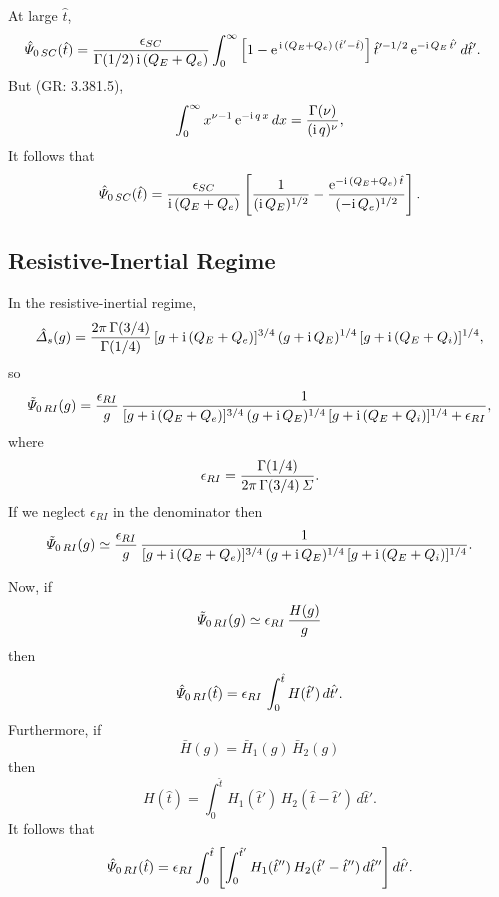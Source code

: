 \documentclass[titlepage=false,12pt]{article}
\begin{document}
At large $\hat{t}$, 
\begin{align}
\hat{\mit\Psi}_{0\,SC}(\hat{t}) &= \frac{\epsilon_{SC}}{\Gamma(1/2)\,{\rm i}\,(Q_E+Q_e)} \int
_0^{\infty}\left[1-{\rm e}^{\,{\rm i}\,(Q_E+Q_e)\,(\hat{t}'-\hat{t})}\right]
\hat{t}'^{-1/2}\,{\rm e}^{-{\rm i}\,Q_E\,\hat{t'}}\,d\hat{t}'.
\end{align}
But (GR: 3.381.5), 
\begin{equation}
\int_0^\infty x^{\nu-1}\,{\rm e}^{-{\rm i}\,q\,x}\,dx = \frac{\Gamma(\nu)}{({\rm i}\,q)^{\nu}},
\end{equation}
It follows that
\begin{equation}
\hat{\mit\Psi}_{0\,SC}(\hat{t}) = \frac{\epsilon_{SC}}{{\rm i}\,(Q_E+Q_e)}
\left[\frac{1}{({\rm i}\,Q_E)^{1/2}} - \frac{{\rm e}^{-{\rm i}\,(Q_E+Q_e)\,\hat{t}}}{(-{\rm i}\,Q_e)^{1/2}}\right].
\end{equation}

\subsection{Resistive-Inertial Regime}
In the resistive-inertial regime, 
\begin{equation}
\hat{\mit\Delta}_s(g) = \frac{2\pi\,\Gamma(3/4)}{\Gamma(1/4)}\,[g+{\rm i}\,(Q_E+Q_e)]^{3/4}\,(g+{\rm i}\,Q_E)^{1/4}\,[g+ {\rm i}\,(Q_E+Q_i)]^{1/4},
\end{equation}
so 
\begin{equation}
\tilde{\mit\Psi}_{0\,RI}(g) =\frac{\epsilon_{RI}}{g}\,\frac{1}{[g+{\rm i}\,(Q_E+Q_e)]^{3/4}\,(g+{\rm i}\,Q_E)^{1/4}\,[g+ {\rm i}\,(Q_E+Q_i)]^{1/4}
+\epsilon_{RI}},
\end{equation}
where
\begin{equation}
\epsilon_{RI}= \frac{\Gamma(1/4)}{2\pi\,\Gamma(3/4)\,{\mit\Sigma}}.
\end{equation}
If we neglect $\epsilon_{RI}$ in the denominator then
\begin{equation}
\tilde{\mit\Psi}_{0\,RI}(g) \simeq\frac{\epsilon_{RI}}{g}\,\frac{1}{[g+{\rm i}\,(Q_E+Q_e)]^{3/4}\,(g+{\rm i}\,Q_E)^{1/4}\,[g+ {\rm i}\,(Q_E+Q_i)]^{1/4}}.
\end{equation}

Now, if
\begin{equation}
\tilde{\mit\Psi}_{0\,RI}(g) \simeq \epsilon_{RI}\,\frac{H(g)}{g}
\end{equation}
then
\begin{equation}
\hat{\mit\Psi}_{0\,RI}(\hat{t}) = \epsilon_{RI}\,\int_0^{\hat{t}}H(\hat{t}')\,d\hat{t'}.
\end{equation}
Furthermore, if
\begin{equation}
\bar{H}(g) = \bar{H}_1(g)\,\bar{H}_2(g)
\end{equation}
then
\begin{equation}
H(\hat{t})=\int_0^{\hat{t}}H_1(\hat{t}')\,H_2(\hat{t}-\hat{t}')\,d\hat{t}'.
\end{equation}
It follows that
\begin{equation}
\hat{\mit\Psi}_{0\,RI}(\hat{t}) = \epsilon_{RI}\int_0^{\hat{t}}\left[\int_0^{\hat{t}'}
H_1(\hat{t}'')\,H_2(\hat{t}'-\hat{t}'')\,d\hat{t}''\right]d\hat{t'}.
\end{equation}
\end{document}
